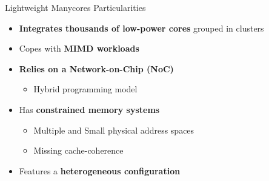 	\begin{frame}[fragile]{Lightweight Manycores Particularities}
		\begin{itemize}
			\item \textbf{Integrates thousands of low-power cores} grouped in clusters
			\item Copes with \textbf{MIMD workloads}
			\item \textbf{Relies on a Network-on-Chip (NoC)} %
			\begin{itemize}
				\item Hybrid programming model
			\end{itemize}
			\item Has \textbf{constrained memory systems}
			\begin{itemize}
				\item Multiple and Small physical address spaces
				\item Missing cache-coherence
			\end{itemize}
			\item Features a \textbf{heterogeneous configuration}
		\end{itemize}


	\end{frame}

